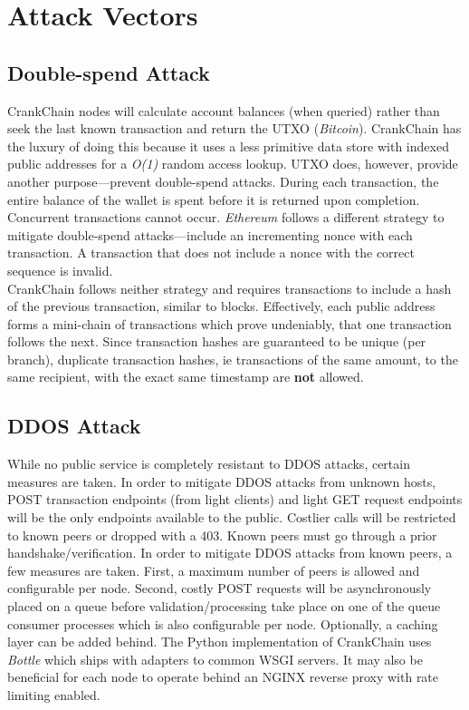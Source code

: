 \documentclass[10pt,twocolumn]{article}
\begin{document}
\section{Attack Vectors}
\subsection{Double-spend Attack}
CrankChain nodes will calculate account balances (when queried) rather than seek the last known transaction and return the UTXO (\textit{Bitcoin}).  CrankChain has the luxury of doing this because it uses a less primitive data store with indexed public addresses for a \textit{O(1)} random access lookup.  UTXO does, however, provide another purpose---prevent double-spend attacks\cite{conf:nakamoto}.  During each transaction, the entire balance of the wallet is spent before it is returned upon completion.  Concurrent transactions cannot occur.  \textit{Ethereum} follows a different strategy to mitigate double-spend attacks---include an incrementing nonce with each transaction\cite{whitepaper:buterin}.  A transaction that does not include a nonce with the correct sequence is invalid.\\
CrankChain follows neither strategy and requires transactions to include a hash of the previous transaction, similar to blocks.  Effectively, each public address forms a mini-chain of transactions which prove undeniably, that one transaction follows the next.  Since transaction hashes are guaranteed to be unique (per branch), duplicate transaction hashes, ie transactions of the same amount, to the same recipient, with the exact same timestamp are \textbf{not} allowed.
\subsection{DDOS Attack}
While no public service is completely resistant to DDOS attacks, certain measures are taken.  In order to mitigate DDOS attacks from unknown hosts, POST transaction endpoints (from light clients) and light GET request endpoints will be the only endpoints available to the public.  Costlier calls will be restricted to known peers or dropped with a 403.  Known peers must go through a prior handshake/verification.  In order to mitigate DDOS attacks from known peers, a few measures are taken.  First, a maximum number of peers is allowed and configurable per node.  Second, costly POST requests will be asynchronously placed on a queue before validation/processing take place on one of the queue consumer processes which is also configurable per node.  Optionally, a caching layer can be added behind.  The Python implementation of CrankChain uses \textit{Bottle}\cite{website:bottledocs} which ships with adapters to common WSGI servers.  It may also be beneficial for each node to operate behind an NGINX reverse proxy with rate limiting enabled.  
\end{document}
